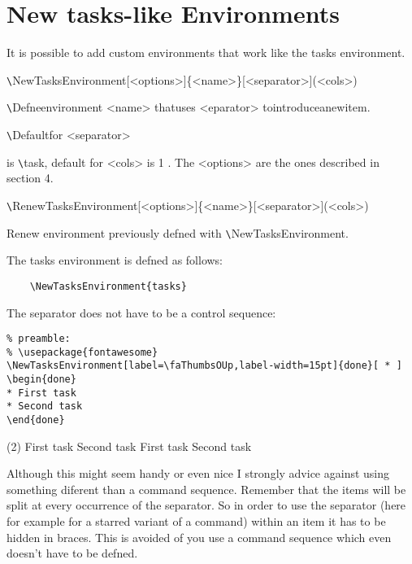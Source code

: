 \documentclass[a4paper,12pt,indent]{article}
\begin{document}
\section{New tasks-like Environments}

It is possible to add custom environments that work like the tasks environment.

\verb|\|\textcolor{Tasks}{NewTasksEnvironment[<options>]\{<name>\}[<separator>](<cols>)}

\verb|\|\textcolor{Tasks}{Defneenvironment <name> thatuses <eparator> tointroduceanewitem}.

\verb|\|\textcolor{Tasks}{Defaultfor <separator>}

is \verb|\|\textcolor{Tasks}{task}, default for <cols> is 1 . The <options> are the ones described in section 4.

\verb|\|\textcolor{Tasks}{RenewTasksEnvironment[<options>]\{<name>\}[<separator>](<cols>)}

Renew environment previously defned with \verb|\|\textcolor{Tasks}{NewTasksEnvironment}.

The tasks environment is defned as follows:

\begin{tcolorbox}[collower=black,colframe=Tasks,colback=white]
    \begin{lstlisting}
    \NewTasksEnvironment{tasks}
    \end{lstlisting}
\end{tcolorbox}

The separator does not have to be a control sequence:

\begin{tcolorbox}[collower=black,colframe=Tasks,colback=white]
    \begin{lstlisting}
% preamble:
% \usepackage{fontawesome}
\NewTasksEnvironment[label=\faThumbsOUp,label-width=15pt]{done}[ * ]
\begin{done}
* First task
* Second task
\end{done}
\end{lstlisting}
        \tcblower
\begin{tasks}(2)
\task[$\clubsuit$] First task
\task[$\spadesuit $] Second task
\task[$\surd $] First task
\task[$\heartsuit $] Second task
\end{tasks}
\end{tcolorbox}

Although this might seem handy or even nice I strongly advice against using something
diferent than a command sequence. Remember that the items will be split at every occurrence
of the separator. So in order to use the separator (here for example for a starred variant of a
command) within an item it has to be hidden in braces. This is avoided of you use a command
sequence which even doesn’t have to be defned.
\end{document}
